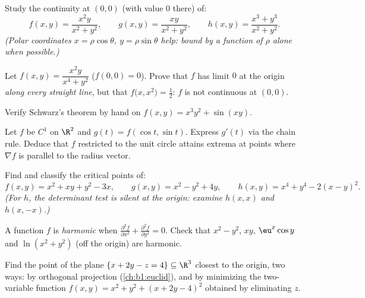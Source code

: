 \begin{exercise}[$\star$]\label{exo:b1:multivar:2}
Study the continuity at $(0,0)$ (with value $0$ there) of:
\[
f(x,y) = \frac{x^2 y}{x^2 + y^2},
\qquad
g(x,y) = \frac{xy}{x^2 + y^2},
\qquad
h(x,y) = \frac{x^3 + y^3}{x^2 + y^2}.
\]
\emph{(Polar coordinates $x = \rho\cos\theta$, $y = \rho\sin\theta$
help: bound by a function of $\rho$ alone when possible.)}
\end{exercise}

\begin{exercise}[$\star\star$]\label{exo:b1:multivar:3}
Let $f(x,y) = \dfrac{x^2 y}{x^4 + y^2}$ ($f(0,0) = 0$). Prove that
$f$ has limit $0$ at the origin \emph{along every straight line},
but that $f\bigl(x, x^2\bigr) = \frac12$: $f$ is not continuous at
$(0,0)$.
\end{exercise}

\begin{exercise}[$\star$]\label{exo:b1:multivar:4}
Verify Schwarz's theorem by hand on $f(x, y) = x^3 y^2 + \sin(xy)$.
\end{exercise}

\begin{exercise}[$\star\star$]\label{exo:b1:multivar:5}
Let $f$ be $C^1$ on $\R^2$ and $g(t) = f(\cos t, \sin t)$. Express
$g'(t)$ via the chain rule. Deduce that $f$ restricted to the unit
circle attains extrema at points where $\nabla f$ is parallel to
the radius vector.
\end{exercise}

\begin{exercise}[$\star\star$]\label{exo:b1:multivar:6}
Find and classify the critical points of:
\[
f(x, y) = x^2 + xy + y^2 - 3x,
\qquad
g(x, y) = x^2 - y^2 + 4y,
\qquad
h(x, y) = x^4 + y^4 - 2(x - y)^2 .
\]
\emph{(For $h$, the determinant test is silent at the origin:
examine $h(x, x)$ and $h(x, -x)$.)}
\end{exercise}

\begin{exercise}[$\star\star$]\label{exo:b1:multivar:7}
A function $f$ is \emph{harmonic} when $\frac{\partial^2 f}{\partial
x^2} + \frac{\partial^2 f}{\partial y^2} = 0$. Check that $x^2 -
y^2$, $xy$, $\eu^x\cos y$ and $\ln(x^2 + y^2)$ (off the origin) are
harmonic.
\end{exercise}

\begin{exercise}[$\star\star\star$]\label{exo:b1:multivar:8}
Find the point of the plane $\{x + 2y - z = 4\} \subseteq \R^3$
closest to the origin, two ways: by orthogonal projection
(\cref{ch:b1:euclid}), and by minimizing the two-variable function
$f(x, y) = x^2 + y^2 + (x + 2y - 4)^2$ obtained by eliminating $z$.
\end{exercise}

